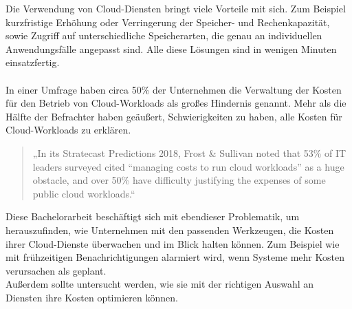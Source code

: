 \begin{comment}
\\\\
”Heute hatten wir 17 Gäste für unsere derzeit 20 Zimmer. Für die kommende Messe am Wochenende sind wir bereit 500 Gäste zu empfangen. Nach der Messe werden wir mit unseren üblichen 20 Zimmern wie immer gut arbeiten können.”
Normalerweise bräuchte man eine große Investition zu machen, um solche kurzfristige Nachfrage zu erfüllen. Vergleichbar ist es bei traditionellen IT-Infrastrukturen, mehr Kapazitätsbedarf, würde die Anschaffung von einer neuen Hardware bedeuten.
\\\\
\end{comment}
Die Verwendung von Cloud-Diensten bringt viele Vorteile mit sich. Zum Beispiel kurzfristige Erhöhung oder Verringerung der Speicher- und Rechenkapazität, sowie Zugriff auf unterschiedliche Speicherarten, die genau an individuellen Anwendungsfälle angepasst sind. Alle diese Lösungen sind in wenigen Minuten einsatzfertig. 
\\\\
In einer Umfrage haben circa 50\% der Unternehmen die Verwaltung der Kosten für den Betrieb von Cloud-Workloads als großes Hindernis genannt. Mehr als die Hälfte der Befrachter haben geäußert, Schwierigkeiten zu haben, alle Kosten für Cloud-Workloads zu erklären. 
\begin{quote}
    „In its Stratecast Predictions 2018, Frost \& Sullivan noted that 53\% of IT leaders surveyed cited “managing costs to run cloud workloads” as a huge obstacle, and over 50\% have difficulty justifying the expenses of some public cloud workloads.“  
    {\cite{SP1}}
    \end{quote}

\begin{flushleft}
Diese Bachelorarbeit beschäftigt sich mit ebendieser Problematik, um herauszufinden, wie Unternehmen mit den passenden Werkzeugen, die Kosten ihrer Cloud-Dienste überwachen und im Blick halten können. 
Zum Beispiel wie mit frühzeitigen Benachrichtigungen alarmiert wird, wenn Systeme mehr Kosten verursachen als geplant.
\\
Außerdem sollte untersucht werden, wie sie mit der richtigen Auswahl an Diensten ihre Kosten optimieren können.
\end{flushleft}

